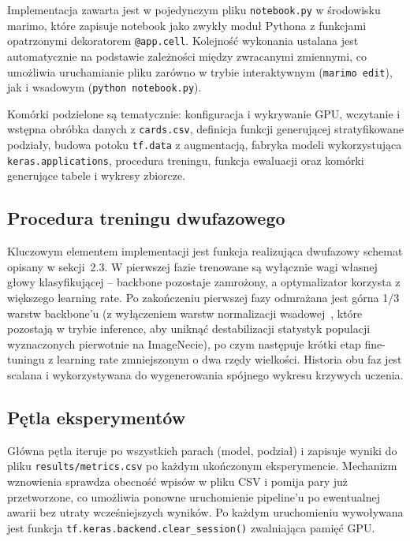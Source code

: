 \documentclass[12pt]{article}
\begin{document}
Implementacja zawarta jest w pojedynczym pliku \texttt{notebook.py} w środowisku marimo, które zapisuje notebook jako zwykły moduł Pythona z funkcjami opatrzonymi dekoratorem \texttt{@app.cell}. Kolejność wykonania ustalana jest automatycznie na podstawie zależności między zwracanymi zmiennymi, co umożliwia uruchamianie pliku zarówno w trybie interaktywnym (\texttt{marimo edit}), jak i wsadowym (\texttt{python notebook.py}).

Komórki podzielone są tematycznie: konfiguracja i wykrywanie GPU, wczytanie i wstępna obróbka danych z \texttt{cards.csv}, definicja funkcji generującej stratyfikowane podziały, budowa potoku \texttt{tf.data} z augmentacją, fabryka modeli wykorzystująca \texttt{keras.applications}, procedura treningu, funkcja ewaluacji oraz komórki generujące tabele i wykresy zbiorcze.

\subsection{Procedura treningu dwufazowego}

Kluczowym elementem implementacji jest funkcja realizująca dwufazowy schemat opisany w sekcji~2.3. W pierwszej fazie trenowane są wyłącznie wagi własnej głowy klasyfikującej -- backbone pozostaje zamrożony, a optymalizator korzysta z większego learning rate. Po zakończeniu pierwszej fazy odmrażana jest górna 1/3 warstw backbone'u (z wyłączeniem warstw normalizacji wsadowej~\cite{batchnorm}, które pozostają w trybie inference, aby uniknąć destabilizacji statystyk populacji wyznaczonych pierwotnie na ImageNecie), po czym następuje krótki etap fine-tuningu z learning rate zmniejszonym o dwa rzędy wielkości. Historia obu faz jest scalana i wykorzystywana do wygenerowania spójnego wykresu krzywych uczenia.

\subsection{Pętla eksperymentów}

Główna pętla iteruje po wszystkich parach (model, podział) i zapisuje wyniki do pliku \texttt{results/metrics.csv} po każdym ukończonym eksperymencie. Mechanizm wznowienia sprawdza obecność wpisów w pliku CSV i pomija pary już przetworzone, co umożliwia ponowne uruchomienie pipeline'u po ewentualnej awarii bez utraty wcześniejszych wyników. Po każdym uruchomieniu wywoływana jest funkcja \texttt{tf.keras.backend.clear\_session()} zwalniająca pamięć GPU.
\end{document}

